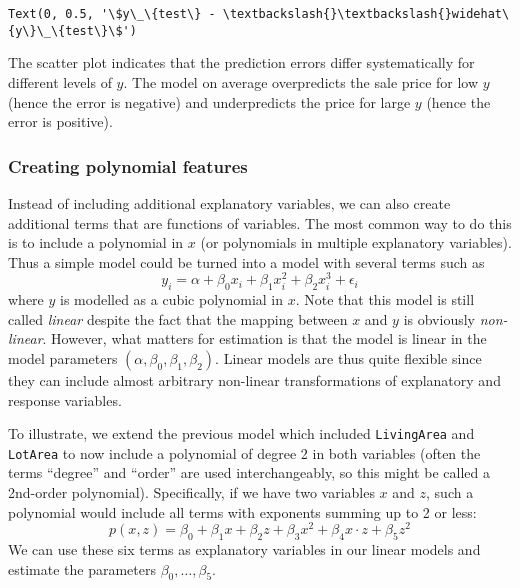 \documentclass{scrartcl}
\makeatletter
\newcommand{\boxspacing}{\kern\kvtcb@left@rule\kern\kvtcb@boxsep}
\newcommand{\prompt}[4]{
        {\ttfamily\llap{{\color{#2}[#3]:\hspace{3pt}#4}}\vspace{-\baselineskip}}
    }
\makeatother
\begin{document}
            \begin{tcolorbox}[breakable, size=fbox, boxrule=.5pt, pad at break*=1mm, opacityfill=0]
\prompt{Out}{outcolor}{19}{\boxspacing}
\begin{Verbatim}[commandchars=\\\{\}]
Text(0, 0.5, '\$y\_\{test\} - \textbackslash{}\textbackslash{}widehat\{y\}\_\{test\}\$')
\end{Verbatim}
\end{tcolorbox}
        
    \begin{center}
    \end{center}
    
    The scatter plot indicates that the prediction errors differ
systematically for different levels of \(y\). The model on average
overpredicts the sale price for low \(y\) (hence the error is negative)
and underpredicts the price for large \(y\) (hence the error is
positive).

    \hypertarget{creating-polynomial-features}{%
\subsubsection{Creating polynomial
features}\label{creating-polynomial-features}}

Instead of including additional explanatory variables, we can also
create additional terms that are functions of variables. The most common
way to do this is to include a polynomial in \(x\) (or polynomials in
multiple explanatory variables). Thus a simple model could be turned
into a model with several terms such as \[
y_i = \alpha + \beta_0 x_i + \beta_1 x_i^2 + \beta_2 x_i^3 + \epsilon_i
\] where \(y\) is modelled as a cubic polynomial in \(x\). Note that
this model is still called \emph{linear} despite the fact that the
mapping between \(x\) and \(y\) is obviously \emph{non-linear}. However,
what matters for estimation is that the model is linear in the model
parameters \((\alpha, \beta_0, \beta_1, \beta_2)\). Linear models are
thus quite flexible since they can include almost arbitrary non-linear
transformations of explanatory and response variables.

    To illustrate, we extend the previous model which included
\texttt{LivingArea} and \texttt{LotArea} to now include a polynomial of
degree 2 in both variables (often the terms ``degree'' and ``order'' are
used interchangeably, so this might be called a 2nd-order polynomial).
Specifically, if we have two variables \(x\) and \(z\), such a
polynomial would include all terms with exponents summing up to 2 or
less: \[
p(x,z) = \beta_0 + \beta_1 x + \beta_2 z + \beta_3 x^2 + \beta_4 x \cdot z + \beta_5 z^2
\] We can use these six terms as explanatory variables in our linear
models and estimate the parameters \(\beta_0,\dots,\beta_5\).
\end{document}
